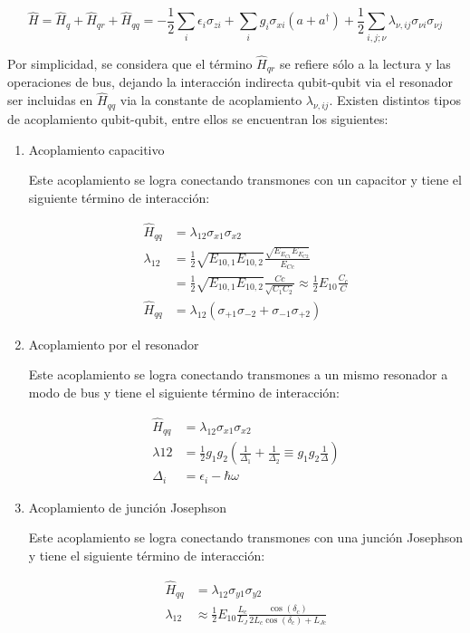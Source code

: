 \[
\hat{H} = \hat{H}_q + \hat{H}_{qr} + \hat{H}_{qq} = -\frac{1}{2} \sum\limits_i \epsilon_i \sigma_{zi} + \sum\limits_i g_i \sigma_{xi} (a+a^\dag) + \frac{1}{2} \sum\limits_{i,j;\nu} \lambda_{\nu,ij} \sigma_{\nu i} \sigma_{\nu j}
\]

Por simplicidad, se considera que el término $\hat{H}_{qr}$ se refiere sólo a la lectura y las operaciones de bus, dejando la interacción indirecta qubit-qubit via el resonador ser incluidas en $\hat{H}_{qq}$ via la constante de acoplamiento $\lambda_{\nu,ij}$. Existen distintos tipos de acoplamiento qubit-qubit, entre ellos se encuentran los siguientes:

\begin{enumerate}
    \item Acoplamiento capacitivo

        Este acoplamiento se logra conectando transmones con un capacitor y tiene el siguiente término de interacción:

        \begin{align*}
            \hat{H}_{qq} &= \lambda_{1 2} \sigma_{x1} \sigma_{x2} \\
            \lambda_{1 2} &= \frac{1}{2} \sqrt{E_{1 0, 1} E_{1 0, 2}} \frac{\sqrt{E_{E_{C1}} E_{E_{C2}}}}{E_{Cc}} \\
                          &= \frac{1}{2} \sqrt{E_{1 0, 1} E_{1 0, 2}} \frac{Cc}{\sqrt{C_1 C_2}} \approx \frac{1}{2} E_{1 0} \frac{C_c}{C} \\
            \hat{H}_{qq} &= \lambda_{1 2} (\sigma_{+1} \sigma_{-2}  + \sigma_{-1} \sigma_{+2})
        \end{align*}

    \item Acoplamiento por el resonador

        Este acoplamiento se logra conectando transmones a un mismo resonador a modo de bus y tiene el siguiente término de interacción:

        \begin{align*}
            \hat{H}_{qq} &= \lambda_{1 2} \sigma_{x1} \sigma_{x2} \\
            \lambda{1 2} &= \frac{1}{2} g_1 g_2 (\frac{1}{\Delta_1} + \frac{1}{\Delta_2} \equiv g_1 g_2 \frac{1}{\Delta}) \\
            \Delta_i &= \epsilon_i - \hbar \omega
        \end{align*}

    \item Acoplamiento de junción Josephson

        Este acoplamiento se logra conectando transmones con una junción Josephson y tiene el siguiente término de interacción:

        \begin{align*}
            \hat{H}_{qq} &= \lambda_{1 2} \sigma_{y1} \sigma_{y2} \\
            \lambda_{1 2} &\approx \frac{1}{2} E_{1 0} \frac{L_c}{L_J} \frac{\cos(\delta_c)}{2L_c \cos(\delta_c) + L_{J c}}
        \end{align*}
\end{enumerate}

